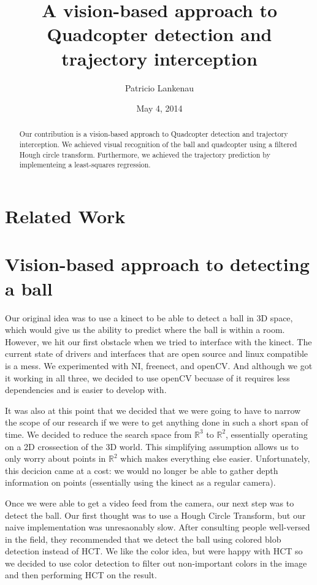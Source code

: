 \documentclass{article}
\title{A vision-based approach to Quadcopter detection and trajectory interception}
\author{Patricio Lankenau}
\date{May 4, 2014}
\begin{document}
\maketitle

\begin{abstract}
Our contribution is a vision-based approach to Quadcopter detection and trajectory interception.
We achieved visual recognition of the ball and quadcopter using a filtered Hough circle transform.
Furthermore, we achieved the trajectory prediction by implementeing a least-squares regression.
\end{abstract}

\section{Related Work}

\section{Vision-based approach to detecting a ball}

Our original idea was to use a kinect to be able to detect a ball in 3D space, which would give
us the ability to predict where the ball is within a room. However, we hit our first obstacle
when we tried to interface with the kinect. The current state of drivers and interfaces that
are open source and linux compatible is a mess. We experimented with NI, freenect, and openCV\@.
And although we got it working in all three, we decided to use openCV becuase of it requires less
dependencies and is easier to develop with.

It was also at this point that we decided that we were going to have to narrow the scope of our
research if we were to get anything done in such a short span of time. We decided to reduce the
search space from $\mathbb{R}^3$ to $\mathbb{R}^2$, essentially operating on a 2D crossection of
the 3D world. This simplifying assumption allows us to only worry about points in $\mathbb{R}^2$
which makes everything else easier. Unfortunately, this decicion came at a cost: we would no
longer be able to gather depth information on points (essentially using the kinect as a regular
camera). 

Once we were able to get a video feed from the camera, our next step was to detect the ball. Our
first thought was to use a Hough Circle Transform, but our naive implementation was unresaonably
slow. After consulting people well-versed in the field, they recommended that we detect the ball
using colored blob detection instead of HCT\@. We like the color idea, but were happy with HCT so
we decided to use color detection to filter out non-important colors in the image and then
performing HCT on the result.
\end{document}
